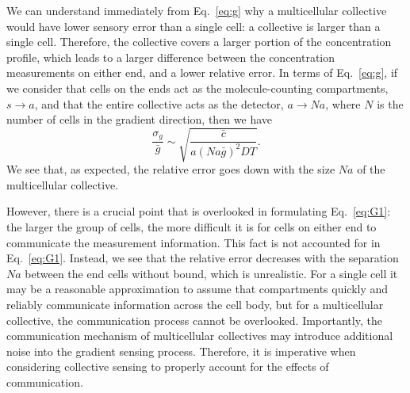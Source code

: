 We can understand immediately from Eq.\ \ref{eq:g} why a multicellular collective would have lower sensory error than a single cell: a collective is larger than a single cell. Therefore, the collective covers a larger portion of the concentration profile, which leads to a larger difference between the concentration measurements on either end, and a lower relative error. In terms of Eq.\ \ref{eq:g}, if we consider that cells on the ends act as the molecule-counting compartments, $s \to a$, and that the entire collective acts as the detector, $a \to Na$, where $N$ is the number of cells in the gradient direction, then we have \cite{mugler2016limits}
\begin{equation}
\label{eq:G1}
\frac{\sigma_g}{\bar{g}} \sim \sqrt{\frac{\bar{c}}{a(Na\bar{g})^2DT}}.
\end{equation}
We see that, as expected, the relative error goes down with the size $Na$ of the multicellular collective.

However, there is a crucial point that is overlooked in formulating Eq.\ \ref{eq:G1}: the larger the group of cells, the more difficult it is for cells on either end to communicate the measurement information. This fact is not accounted for in Eq.\ \ref{eq:G1}. Instead, we see that the relative error decreases with the separation $Na$ between the end cells without bound, which is unrealistic. For a single cell it may be a reasonable approximation to assume that compartments quickly and reliably communicate information across the cell body, but for a multicellular collective, the communication process cannot be overlooked. Importantly, the communication mechanism of multicellular collectives may introduce additional noise into the gradient sensing process. Therefore, it is imperative when considering collective sensing to properly account for the effects of communication.

